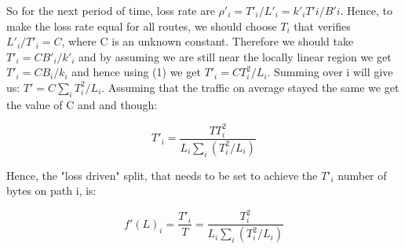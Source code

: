 So for the next period of time, loss rate are $\rho'_{i} = T'_{i}/L'_{i} = k'_{i}T'{i}/B'{i}$. Hence, to make the loss rate equal for all routes, we should choose $T_{i}$ that verifies $L'_{i}/T'_{i}=C$, where C is an unknown constant. Therefore we should take  $T'_{i}= CB'_{i}/k'_{i}$ and by assuming we are still near the locally linear region we get  $T'_{i}= CB_{i}/k_{i}$ and hence using (1) we get  $T'_{i}= CT_{i}^{2}/L_{i}$. Summing over i will give us: $T' = C \sum_{i} T_{i}^2/L_{i}$. Assuming that the traffic on average stayed the same we get the value of C and and though: 

\begin{equation}
T'_{i} = \frac {TT_{i}^{2}} {L_{i} \sum_{i} (T_{i}^2/L_{i})}
\end{equation}

Hence, the "loss driven" split, that needs to be set to achieve the $T'_{i}$ number of bytes on path i, is:

\begin{equation}
f'(L)_{i} = \frac{T'_{i}}{T} =  \frac {T_{i}^{2}} {L_{i} \sum_{i} (T_{i}^2/L_{i})}
\end{equation}


